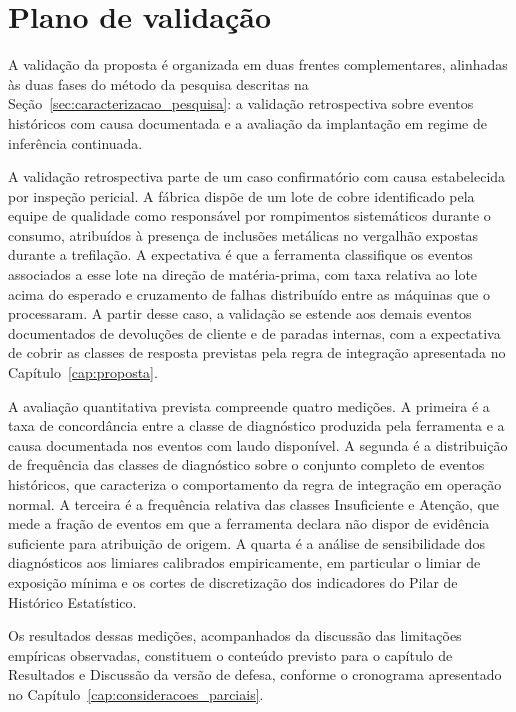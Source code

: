 \section{Plano de validação}
\label{sec:plano_validacao}

A validação da proposta é organizada em duas frentes complementares, alinhadas às duas fases do método da pesquisa descritas na Seção~\ref{sec:caracterizacao_pesquisa}: a validação retrospectiva sobre eventos históricos com causa documentada e a avaliação da implantação em regime de inferência continuada.

A validação retrospectiva parte de um caso confirmatório com causa estabelecida por inspeção pericial. A fábrica dispõe de um lote de cobre identificado pela equipe de qualidade como responsável por rompimentos sistemáticos durante o consumo, atribuídos à presença de inclusões metálicas no vergalhão expostas durante a trefilação. A expectativa é que a ferramenta classifique os eventos associados a esse lote na direção de matéria-prima, com taxa relativa ao lote acima do esperado e cruzamento de falhas distribuído entre as máquinas que o processaram. A partir desse caso, a validação se estende aos demais eventos documentados de devoluções de cliente e de paradas internas, com a expectativa de cobrir as classes de resposta previstas pela regra de integração apresentada no Capítulo~\ref{cap:proposta}.

A avaliação quantitativa prevista compreende quatro medições. A primeira é a taxa de concordância entre a classe de diagnóstico produzida pela ferramenta e a causa documentada nos eventos com laudo disponível. A segunda é a distribuição de frequência das classes de diagnóstico sobre o conjunto completo de eventos históricos, que caracteriza o comportamento da regra de integração em operação normal. A terceira é a frequência relativa das classes Insuficiente e Atenção, que mede a fração de eventos em que a ferramenta declara não dispor de evidência suficiente para atribuição de origem. A quarta é a análise de sensibilidade dos diagnósticos aos limiares calibrados empiricamente, em particular o limiar de exposição mínima e os cortes de discretização dos indicadores do Pilar de Histórico Estatístico.

Os resultados dessas medições, acompanhados da discussão das limitações empíricas observadas, constituem o conteúdo previsto para o capítulo de Resultados e Discussão da versão de defesa, conforme o cronograma apresentado no Capítulo~\ref{cap:consideracoes_parciais}.


